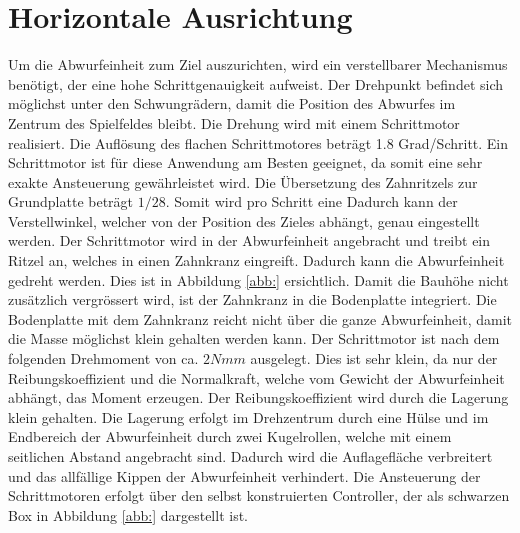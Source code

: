 \section{Horizontale Ausrichtung}
    Um die Abwurfeinheit zum Ziel auszurichten, wird ein verstellbarer Mechanismus 
    benötigt, der eine hohe Schrittgenauigkeit aufweist. Der Drehpunkt befindet sich 
    möglichst unter den Schwungrädern, damit die Position des Abwurfes im Zentrum des 
    Spielfeldes bleibt. Die Drehung wird mit einem Schrittmotor realisiert. Die 
    Auflösung des flachen Schrittmotores beträgt 1.8 Grad/Schritt. Ein Schrittmotor 
    ist für diese Anwendung am Besten geeignet, da somit eine sehr exakte Ansteuerung 
    gewährleistet wird. Die Übersetzung des Zahnritzels zur Grundplatte beträgt 
    $1/28$. Somit wird pro Schritt eine Dadurch kann der Verstellwinkel, 
    welcher von der Position des Zieles abhängt, genau eingestellt werden. Der 
    Schrittmotor wird in der Abwurfeinheit angebracht und treibt ein Ritzel an, welches 
    in einen Zahnkranz eingreift. Dadurch kann die Abwurfeinheit gedreht werden. Dies 
    ist in Abbildung \ref{abb:} ersichtlich. Damit die Bauhöhe nicht zusätzlich 
    vergrössert wird, ist der Zahnkranz in die Bodenplatte integriert. Die Bodenplatte 
    mit dem Zahnkranz reicht nicht über die ganze Abwurfeinheit, damit die Masse 
    möglichst klein gehalten werden kann. Der Schrittmotor ist nach dem folgenden 
    Drehmoment von ca. $2Nmm$ ausgelegt. Dies ist sehr klein, da nur der Reibungskoeffizient 
    und die Normalkraft, welche vom Gewicht der Abwurfeinheit abhängt, das Moment erzeugen. 
    Der Reibungskoeffizient wird durch die Lagerung klein gehalten. Die Lagerung erfolgt 
    im Drehzentrum durch eine Hülse und im Endbereich der Abwurfeinheit durch zwei 
    Kugelrollen, welche mit einem seitlichen Abstand angebracht sind. Dadurch wird die 
    Auflagefläche verbreitert und das allfällige Kippen der Abwurfeinheit verhindert. 
    Die Ansteuerung der Schrittmotoren erfolgt über den selbst konstruierten Controller, 
    der als schwarzen Box in Abbildung \ref{abb:} dargestellt ist.
